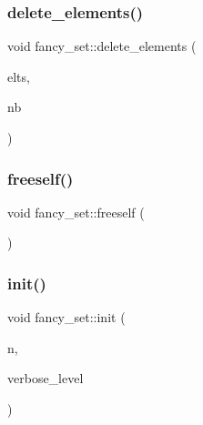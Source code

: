 \subsubsection{\texorpdfstring{delete\+\_\+elements()}{delete\_elements()}}
{\footnotesize\ttfamily void fancy\+\_\+set\+::delete\+\_\+elements (\begin{DoxyParamCaption}\item[{\mbox{\hyperlink{galois_8h_a09fddde158a3a20bd2dcadb609de11dc}{I\+NT}} $\ast$}]{elts,  }\item[{\mbox{\hyperlink{galois_8h_a09fddde158a3a20bd2dcadb609de11dc}{I\+NT}}}]{nb }\end{DoxyParamCaption})}

\mbox{\label{classfancy__set_a3de25ec1378ce4a9e6a8c10413c1d1d3}} 
\subsubsection{\texorpdfstring{freeself()}{freeself()}}
{\footnotesize\ttfamily void fancy\+\_\+set\+::freeself (\begin{DoxyParamCaption}{ }\end{DoxyParamCaption})}

\mbox{\label{classfancy__set_af3ef2500d80ad02c08887b352bc49fb8}} 
\subsubsection{\texorpdfstring{init()}{init()}}
{\footnotesize\ttfamily void fancy\+\_\+set\+::init (\begin{DoxyParamCaption}\item[{\mbox{\hyperlink{galois_8h_a09fddde158a3a20bd2dcadb609de11dc}{I\+NT}}}]{n,  }\item[{\mbox{\hyperlink{galois_8h_a09fddde158a3a20bd2dcadb609de11dc}{I\+NT}}}]{verbose\+\_\+level }\end{DoxyParamCaption})}

\mbox{\label{classfancy__set_a03b0a2b524e9ab493499c0f5f9fe4cfd}} 
